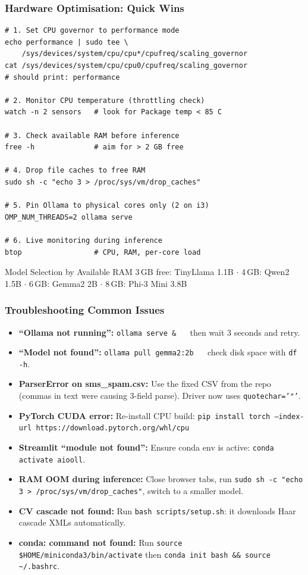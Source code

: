\begin{frame}[fragile]\frametitle{Hardware Optimisation: Quick Wins}
\begin{lstlisting}
# 1. Set CPU governor to performance mode
echo performance | sudo tee \
    /sys/devices/system/cpu/cpu*/cpufreq/scaling_governor
cat /sys/devices/system/cpu/cpu0/cpufreq/scaling_governor
# should print: performance

# 2. Monitor CPU temperature (throttling check)
watch -n 2 sensors   # look for Package temp < 85 C

# 3. Check available RAM before inference
free -h              # aim for > 2 GB free

# 4. Drop file caches to free RAM
sudo sh -c "echo 3 > /proc/sys/vm/drop_caches"

# 5. Pin Ollama to physical cores only (2 on i3)
OMP_NUM_THREADS=2 ollama serve

# 6. Live monitoring during inference
btop                 # CPU, RAM, per-core load
\end{lstlisting}
\begin{block}{Model Selection by Available RAM}
3\,GB free: TinyLlama 1.1B $\cdot$ 4\,GB: Qwen2 1.5B $\cdot$ 6\,GB: Gemma2 2B $\cdot$ 8\,GB: Phi-3 Mini 3.8B
\end{block}
\end{frame}

\begin{frame}[fragile]\frametitle{Troubleshooting Common Issues}
\begin{itemize}
  \item \textbf{``Ollama not running'':}
    \texttt{ollama serve \&} $\quad$ then wait 3 seconds and retry.
  \item \textbf{``Model not found'':}
    \texttt{ollama pull gemma2:2b} $\quad$ check disk space with \texttt{df -h}.
  \item \textbf{ParserError on sms\_spam.csv:}
    Use the fixed CSV from the repo (commas in text were causing 3-field parse). Driver now uses \texttt{quotechar='"'}.
  \item \textbf{PyTorch CUDA error:}
    Re-install CPU build: \texttt{pip install torch --index-url https://download.pytorch.org/whl/cpu}
  \item \textbf{Streamlit ``module not found'':}
    Ensure conda env is active: \texttt{conda activate aiooll}.
  \item \textbf{RAM OOM during inference:}
    Close browser tabs, run \texttt{sudo sh -c "echo 3 > /proc/sys/vm/drop\_caches"}, switch to a smaller model.
  \item \textbf{CV cascade not found:}
    Run \texttt{bash scripts/setup.sh}: it downloads Haar cascade XMLs automatically.
  \item \textbf{conda: command not found:}
    Run \texttt{source \$HOME/miniconda3/bin/activate} then \texttt{conda init bash \&\& source \textasciitilde/.bashrc}.
\end{itemize}
\end{frame}


